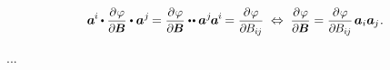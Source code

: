\nopagebreak\vspace{-0.12em}\begin{equation*}
\bm{a}^{\hspace{-0.1ex}i} \hspace{-0.15ex} \dotp \scalebox{0.92}[0.92]{$\displaystyle \frac{\partial \hspace{.1ex} \varphi}{\partial \hspace{-0.1ex} \bm{B}}$} \dotp \bm{a}^j \hspace{-0.2ex}
=
\scalebox{0.92}[0.92]{$\displaystyle \frac{\partial \hspace{.1ex} \varphi}{\partial \hspace{-0.1ex} \bm{B}}$} \dotdotp \bm{a}^j \hspace{-0.2ex} \bm{a}^{\hspace{-0.1ex}i} \hspace{-0.2ex}
=
\scalebox{0.92}[0.92]{$\displaystyle \frac{\partial \hspace{.1ex} \varphi}{\partial \hspace{-0.15ex} B_{i\hspace{-0.1ex}j}}$}
\;\Leftrightarrow\;
\scalebox{0.92}[0.92]{$\displaystyle \frac{\partial \hspace{.1ex} \varphi}{\partial \hspace{-0.1ex} \bm{B}}$}
=
\scalebox{0.92}[0.92]{$\displaystyle \frac{\partial \hspace{.1ex} \varphi}{\partial \hspace{-0.15ex} B_{i\hspace{-0.1ex}j}}$} \hspace{.25ex} \bm{a}_i \bm{a}_{\hspace{-0.1ex}j}
\hspace{.1ex} .
\end{equation*}


...


